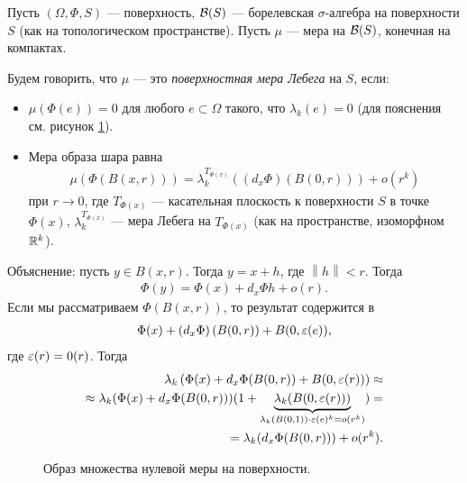 \begin{df}
 \label{definition:lebesgue_measure_on_surface}
 Пусть $(\Omega, \Phi, S)$ --- поверхность, $\mathcal{B}(S)$ --- борелевская $\sigma$-алгебра на поверхности $S$ (как на топологическом пространстве). Пусть $\mu$ --- мера на $\mathcal{B}(S)$, конечная на компактах.

 Будем говорить, что $\mu$ --- это \textit{поверхностная мера Лебега} на $S$, если:
 \begin{itemize}
  \item $\mu(\Phi(e)) = 0$ для любого $e \subset \Omega$ такого, что $\lambda_k(e) = 0$ (для пояснения см. рисунок \ref{fig:small_set_on_surface}).
  \item Мера образа шара равна 
\begin{align}
 \label{equation:surface_lebesgue_measure_ball}
\mu(\Phi(B(x,r))) = \lambda_k^{T_{\Phi(x)}}((d_x \Phi)(B(0, r))) + o(r^{k})
\end{align}
при $r \to 0$, где $T_{\Phi(x)}$ --- касательная плоскость к поверхности $S$ в точке $\Phi(x)$, $\lambda_k^{T_{\Phi(x)}}$ --- мера Лебега на $T_{\Phi(x)}$ (как на пространстве, изоморфном $\mathbb{R}^{k}$).
 \end{itemize}
\end{df}

Объяснение: пусть $y \in B(x, r)$. Тогда $y = x + h$, где $\left\| h \right\| < r$. Тогда 
\begin{align*}
 \Phi(y) = \Phi(x) + d_{x} \Phi h + o(r)
.\end{align*}
Если мы рассматриваем $\Phi(B(x, r))$, то результат содержится в 
\begin{align*}
\Phi(x) + \left( d_x \Phi \right) (B(0, r)) + B(0, \varepsilon(e)),
\end{align*}
 где $\varepsilon(r) = 0(r)$. Тогда
 \begin{align*}
  \lambda_k\left( \Phi(x) + d_x \Phi (B(0, r)) + B(0, \varepsilon(r)) \right) \approx \\
  \approx \lambda_k(\Phi(x) + d_x \Phi(B(0, r)))(1 +  \underbrace{\lambda_k(B(0, \varepsilon(r)))}_{\lambda_k(B(0,1))\cdot \varepsilon(e)^{k} = o(r^{k})} ) = \\
  = \lambda_k(d_x \Phi (B(0, r))) + o(r^{k})
 .\end{align*} 

\begin{figure}[ht]
    \centering
    \caption{Образ множества нулевой меры на поверхности.}
    \label{fig:small_set_on_surface}
\end{figure}


